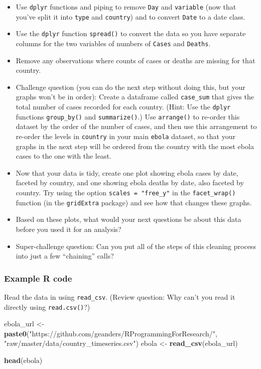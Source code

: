 \documentclass[]{book}
\makeatletter
\newenvironment{Shaded}{\begin{snugshade}}{\end{snugshade}}
\newcommand{\KeywordTok}[1]{\textcolor[rgb]{0.13,0.29,0.53}{\textbf{#1}}}
\newcommand{\StringTok}[1]{\textcolor[rgb]{0.31,0.60,0.02}{#1}}
\newcommand{\NormalTok}[1]{#1}
\providecommand{\tightlist}{%
  \setlength{\itemsep}{0pt}\setlength{\parskip}{0pt}}
\newenvironment{kframe}{%
\medskip{}
\setlength{\fboxsep}{.8em}
 \def\at@end@of@kframe{}%
 \ifinner\ifhmode%
  \def\at@end@of@kframe{\end{minipage}}%
  \begin{minipage}{\columnwidth}%
 \fi\fi%
 \def\FrameCommand##1{\hskip\@totalleftmargin \hskip-\fboxsep
 \colorbox{shadecolor}{##1}\hskip-\fboxsep
     \hskip-\linewidth \hskip-\@totalleftmargin \hskip\columnwidth}%
 \MakeFramed {\advance\hsize-\width
   \@totalleftmargin\z@ \linewidth\hsize
   \@setminipage}}%
 {\par\unskip\endMakeFramed%
 \at@end@of@kframe}
\renewenvironment{Shaded}{\begin{kframe}}{\end{kframe}}
\theoremstyle{definition}
\theoremstyle{definition}
\theoremstyle{definition}
\theoremstyle{remark}
\makeatother
\begin{document}
\begin{itemize}
\tightlist
\item
  Use \texttt{dplyr} functions and piping to remove \texttt{Day} and
  \texttt{variable} (now that you've split it into \texttt{type} and
  \texttt{country}) and to convert \texttt{Date} to a date class.
\item
  Use the \texttt{dplyr} function \texttt{spread()} to convert the data
  so you have separate columns for the two variables of numbers of
  \texttt{Cases} and \texttt{Deaths}.
\item
  Remove any observations where counts of cases or deaths are missing
  for that country.
\item
  Challenge question (you can do the next step without doing this, but
  your graphs won't be in order): Create a dataframe called
  \texttt{case\_sum} that gives the total number of cases recorded for
  each country. (Hint: Use the \texttt{dplyr} functions
  \texttt{group\_by()} and \texttt{summarize()}.) Use \texttt{arrange()}
  to re-order this dataset by the order of the number of cases, and then
  use this arrangement to re-order the levels in \texttt{country} in
  your main \texttt{ebola} dataset, so that your graphs in the next step
  will be ordered from the country with the most ebola cases to the one
  with the least.
\item
  Now that your data is tidy, create one plot showing ebola cases by
  date, faceted by country, and one showing ebola deaths by date, also
  faceted by country. Try using the option \texttt{scales\ =\ "free\_y"}
  in the \texttt{facet\_wrap()} function (in the \texttt{gridExtra}
  package) and see how that changes these graphs.
\item
  Based on these plots, what would your next questions be about this
  data before you used it for an analysis?
\item
  Super-challenge question: Can you put all of the steps of this
  cleaning process into just a few ``chaining'' calls?
\end{itemize}

\subsubsection{Example R code}\label{example-r-code-9}

Read the data in using \texttt{read\_csv}. (Review question: Why can't
you read it directly using \texttt{read.csv()}?)

\begin{Shaded}
\begin{Highlighting}[]
\NormalTok{ebola_url <-}\StringTok{ }\KeywordTok{paste0}\NormalTok{(}\StringTok{"https://github.com/geanders/RProgrammingForResearch/"}\NormalTok{,}
              \StringTok{"raw/master/data/country_timeseries.csv"}\NormalTok{)}
\NormalTok{ebola <-}\StringTok{ }\KeywordTok{read_csv}\NormalTok{(ebola_url)}

\KeywordTok{head}\NormalTok{(ebola)}
\end{Highlighting}
\end{Shaded}
\end{document}
